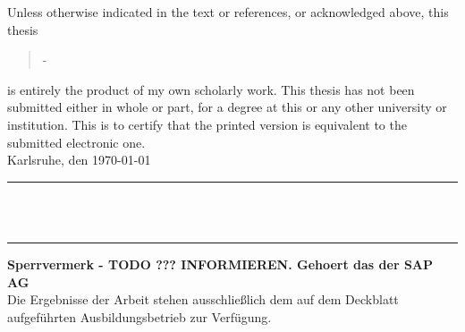 Unless otherwise indicated in the text or references, or acknowledged above, this thesis 
\begin{quote}
\textit{\titel} -\textit{ \untertitel }
\end{quote}
is entirely the product of my own scholarly work. This thesis has not been submitted either in whole or part, for a degree at this or any other university or institution. This is to certify that the printed version is equivalent to the submitted electronic one.\\[10ex]

Karlsruhe, den \today \\[4ex]


\rule[-0.2cm]{5cm}{0.5pt} \\

\textsc{\autor} \\[10ex]

\hrule 
\vspace*{1.0cm}
\noindent \textbf{\Large{Sperrvermerk - TODO ??? INFORMIEREN. Gehoert das der SAP AG}}\\
\normalsize
Die Ergebnisse der Arbeit stehen ausschließlich dem auf dem Deckblatt aufgeführten Ausbildungsbetrieb zur Verfügung.